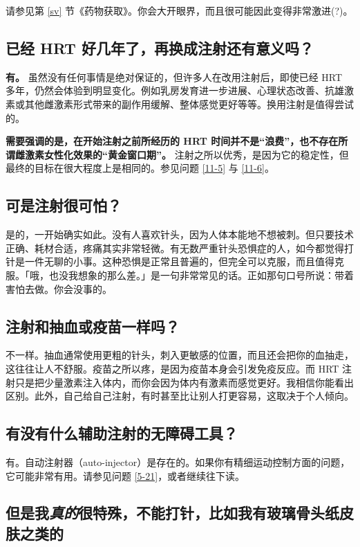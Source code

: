 \documentclass{article}
\begin{document}
请参见第 \ref{sv} 节《药物获取》。你会大开眼界，而且很可能因此变得非常激进(?)。

\subsection{已经 HRT 好几年了，再换成注射还有意义吗？}

\textbf{有。} 虽然没有任何事情是绝对保证的，但许多人在改用注射后，即使已经 HRT 多年，仍然会体验到明显变化。例如乳房发育进一步进展、心理状态改善、抗雄激素或其他雌激素形式带来的副作用缓解、整体感觉更好等等。换用注射是值得尝试的。

\textbf{需要强调的是，在开始注射之前所经历的 HRT 时间并不是“浪费”，也不存在所谓雌激素女性化效果的“黄金窗口期”。} 注射之所以优秀，是因为它的稳定性，但最终的目标在很大程度上是相同的。参见问题 \ref{11-5} 与 \ref{11-6}。

\subsection{可是注射很可怕？}

是的，一开始确实如此。没有人喜欢针头，因为人体本能地不想被刺。但只要技术正确、耗材合适，疼痛其实非常轻微。有无数严重针头恐惧症的人，如今都觉得打针是一件无聊的小事。这种恐惧是正常且普遍的，但完全可以克服，而且值得克服。「哦，也没我想象的那么差。」是一句非常常见的话。正如那句口号所说：带着害怕去做。你会没事的。

\subsection{注射和抽血或疫苗一样吗？}

不一样。抽血通常使用更粗的针头，刺入更敏感的位置，而且还会把你的血抽走，这往往让人不舒服。疫苗之所以疼，是因为疫苗本身会引发免疫反应。而 HRT 注射只是把少量激素注入体内，而你会因为体内有激素而感觉更好。我相信你能看出区别。此外，自己给自己注射，有时甚至比让别人打更容易，这取决于个人倾向。

\subsection{有没有什么辅助注射的无障碍工具？}

有。自动注射器（auto-injector）是存在的。如果你有精细运动控制方面的问题，它可能非常有用。请参见问题 \ref{5-21}，或者继续往下读。

\subsection{但是我\textit{真的}很特殊，不能打针，比如我有玻璃骨头纸皮肤之类的\textemdash{}}
\end{document}
